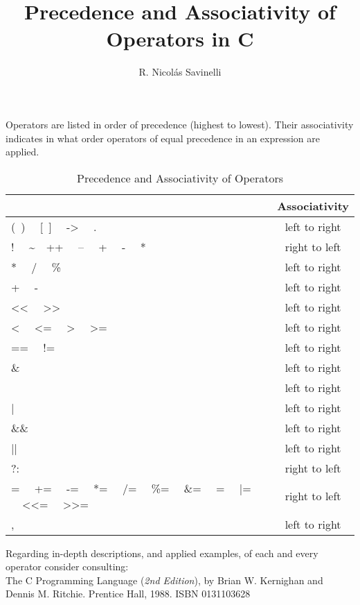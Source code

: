 \documentclass[letter]{article}
\title{\bf{Precedence and Associativity of Operators in C}}
\author{R. Nicolás Savinelli}
\begin{document}
\maketitle{}

Operators are listed in order of precedence (highest to lowest).
Their associativity indicates in what order operators of equal precedence in
an expression are applied.

\begin{table}[!h]
\begin{tabular}{| L | c |}
\hline
{} & \bf{Associativity} \\ \hline
(\ ) \ \ [\ ] \ \ -> \ \ . & left to right \\ \hline
! \ \ \sim \ \ ++ \ \ -- \ \ + \ \ - \ \ * \ \  & right to left \\ \hline
* \ \ / \ \ \% & left to right \\ \hline
+ \ \ - \ \ & left to right \\ \hline
<< \ \ >> \ \ & left to right \\ \hline
< \ \ <= \ \ > \ \ >= & left to right \\ \hline
== \ \ != \ \ & left to right \\ \hline
\& & left to right \\ \hline
\hat{} & left to right \\ \hline
| & left to right \\ \hline
\&\& & left to right \\ \hline
|| & left to right \\ \hline
?: & right to left \\ \hline
= \ \ += \ \ -= \ \ *= \ \ /= \ \ \%= \ \ \&= \ \ \hat{}= \ \ |= \ \ <<= \ \ >>= & right to left \\ \hline
, & left to right \\ \hline
\hline
\end{tabular}
\caption{Precedence and Associativity of Operators}
\end{table}

\noindent
Regarding in-depth descriptions, and applied examples, of each and every
operator consider consulting: \\

\noindent
The C Programming Language ({\it{2nd Edition}}), by Brian W. Kernighan and
Dennis M. Ritchie. Prentice Hall, 1988. ISBN 0131103628
\end{document}
